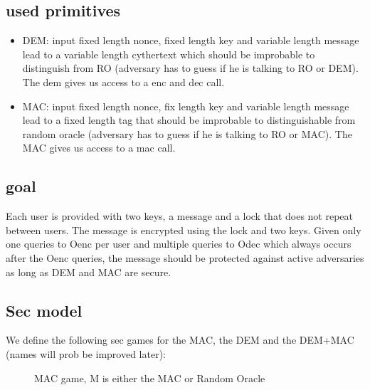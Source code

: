 \documentclass{article}
\begin{document}
\subsection{used primitives}
\begin{itemize}
    \item DEM: input fixed length nonce, fixed length key and variable length message lead to a variable length cythertext which should be improbable to distinguish from RO (adversary has to guess if he is talking to RO or DEM). The dem gives us access to a enc and dec call.
    
    \item MAC: input fixed length nonce, fix length key and variable length message lead to a fixed length tag that should be improbable to distinguishable from random oracle (adversary has to guess if he is talking to RO or MAC). The MAC gives us access to a mac call.
\end{itemize}

\subsection{goal}
Each user is provided with two keys, a message and a lock that does not repeat between users. The message is encrypted using the lock and two keys. Given only one queries to Oenc per user and multiple queries to Odec which always occurs after the Oenc queries, the message should be protected against active adversaries as long as DEM and MAC are secure.

\subsection{Sec model}
We define the following sec games for the MAC, the DEM and the DEM+MAC (names will prob be improved later):

\begin{figure}[H]
    \begin{pchstack}[boxed,center,space=0.5cm]
    \end{pchstack}
\caption{MAC game, M is either the MAC or Random Oracle}
\end{figure}
\end{document}
